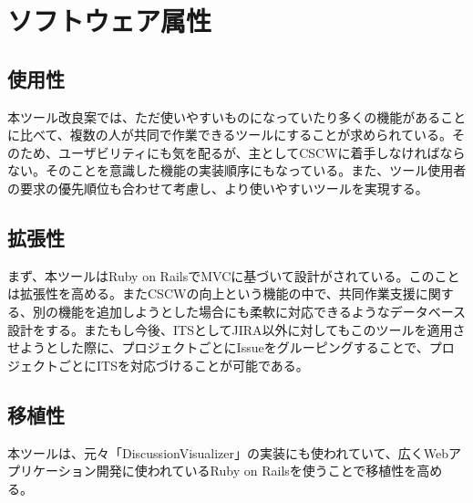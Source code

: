 \documentclass[12pt, oneside]{jreport}
\begin{document}
	\section{ソフトウェア属性}
	
		\subsection{使用性}
		本ツール改良案では、ただ使いやすいものになっていたり多くの機能があることに比べて、複数の人が共同で作業できるツールにすることが求められている。そのため、ユーザビリティにも気を配るが、主としてCSCWに着手しなければならない。そのことを意識した機能の実装順序にもなっている。また、ツール使用者の要求の優先順位も合わせて考慮し、より使いやすいツールを実現する。
		
		\subsection{拡張性}
		まず、本ツールはRuby on RailsでMVCに基づいて設計がされている。このことは拡張性を高める。またCSCWの向上という機能の中で、共同作業支援に関する、別の機能を追加しようとした場合にも柔軟に対応できるようなデータベース設計をする。またもし今後、ITSとしてJIRA以外に対してもこのツールを適用させようとした際に、プロジェクトごとにIssueをグルーピングすることで、プロジェクトごとにITSを対応づけることが可能である。
		
		\subsection{移植性}
		本ツールは、元々「DiscussionVisualizer」の実装にも使われていて、広くWebアプリケーション開発に使われているRuby on Railsを使うことで移植性を高める。
\end{document}
